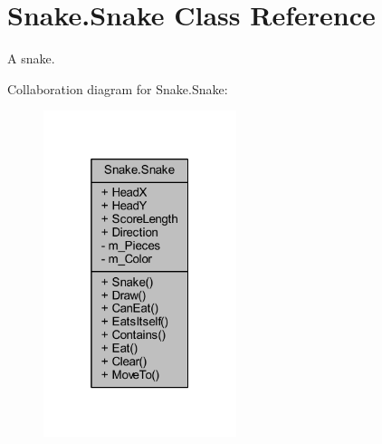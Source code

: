 \hypertarget{class_snake_1_1_snake}{}\section{Snake.\+Snake Class Reference}
\label{class_snake_1_1_snake}


A snake.  




Collaboration diagram for Snake.\+Snake\+:
\nopagebreak
\begin{figure}[H]
\begin{center}
\leavevmode
\includegraphics[width=160pt]{df/d81/class_snake_1_1_snake__coll__graph}
\end{center}
\end{figure}
